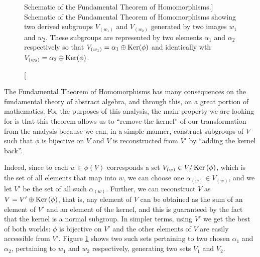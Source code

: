 \begin{figure}[h]
\caption
[Schematic of the Fundamental Theorem of Homomorphisms.]
{{Schematic of the Fundamental Theorem of Homomorphisms showing two derived subgroups $V_{(w_1)}$ and $V_{(w_2)}$ generated by two images $w_1$ and $w_2$. These subgroups are represented by two elements $\alpha_1$ and $\alpha_2$ respectively so that $V_{(w_1)} = \alpha_1\oplus\operatorname{Ker}(\phi)$ and identically wth $V_{(w_2)} = \alpha_2\oplus\operatorname{Ker}(\phi)$.}}
\label{fig:first_homo}
\end{figure} %

	The Fundamental Theorem of Homomorphisms has many consequences on the fundamental theory of abstract algebra, and through this, on a great portion of mathematics. For the purposes of this analysis, the main property we are looking for is that this theorem allows us to ``remove the kernel'' of our transformation from the analysis because we can, in a simple manner, construct subgroups of $V$ such that $\phi$ is bijective on $V$ and $V$ is reconstructed from $V'$ by ``adding the kernel back''.

	Indeed, since to each $w\in\phi\left(V\right)$ corresponds a set $V_{(w)} \in V/\operatorname{Ker}\left(\phi\right)$, which is the set of all elements that map into $w$, we can choose one $\alpha_{(w)}\in V_{(w)}$, and we let $V'$ be the set of all such $\alpha_{(w)}$. Further, we can reconstruct $V$ as $V = V' \oplus \operatorname{Ker}\left(\phi\right)$, that is, any element of $V$ can be obtained as the sum of an element of $V'$ and an element of the kernel, and this is guaranteed by the fact that the kernel is a normal subgroup. In simpler terms, using $V'$ we get the best of both worlds: $\phi$ is bijective on $V'$ and the other elements of $V$ are easily accessible from $V'$. Figure \ref{fig:first_homo} shows two such sets pertaining to two chosen $\alpha_1$ and $\alpha_2$, pertaining to $w_1$ and $w_2$ respectively, generating two sets $V_1$ and $V_2$.

